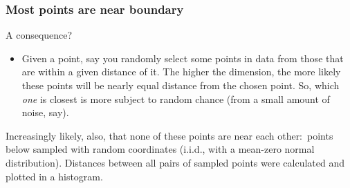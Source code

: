 \documentclass[smaller]{beamer}
\theoremstyle{example}
\begin{document}
\begin{frame}
    \frametitle{Most points are near boundary}
    A consequence? 
    
    \begin{itemize}
        \item Given a point, say you randomly select some points in data from those that are within a given distance of it. \newline 
        \pause
        The higher the dimension, the more likely these points will be nearly equal distance from the chosen point. So, which \textit{one} is closest is more subject to random chance (from a small amount of noise, say). 
    \end{itemize}

    \pause
    Increasingly likely, also, that none of these points are near each other:\pause \ points below sampled with random coordinates (i.i.d., with a mean-zero normal distribution). Distances between all pairs of sampled points were calculated and plotted in a histogram. 


\end{frame}
\end{document}
